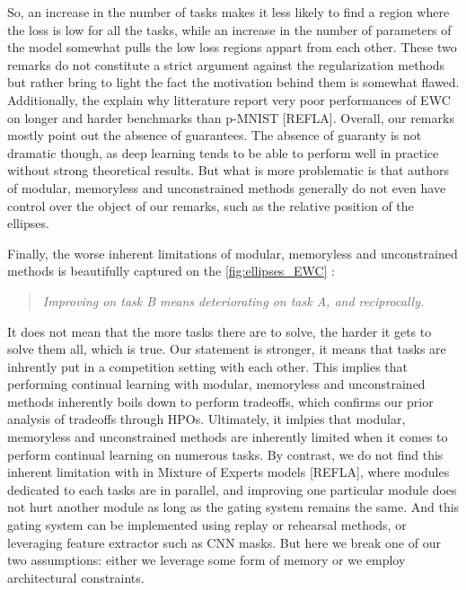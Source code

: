 \documentclass[11pt]{article}
\begin{document}
\vspace{2mm}
\noindent
So, an increase in the number of tasks makes it less likely to find a region where the loss is low for all the tasks, while an increase in the number of parameters of the model somewhat pulls the low loss regions appart from each other. These two remarks do not constitute a strict argument against the regularization methods but rather bring to light the fact the motivation behind them is somewhat flawed. Additionally, the explain why litterature report very poor performances of EWC on longer and harder benchmarks than p-MNIST [REFLA]. Overall, our remarks mostly point out the absence of guarantees. The absence of guaranty is not dramatic though, as deep learning tends to be able to perform well in practice without strong theoretical results. But what is more problematic is that authors of modular, memoryless and unconstrained methods generally do not even have control over the object of our remarks, such as the relative position of the ellipses.

\vspace{2mm}
\noindent
Finally, the worse inherent limitations of modular, memoryless and unconstrained methods is beautifully captured on the \ref{fig:ellipses_EWC} :
\begin{quote}
    \itshape
    \centering
    Improving on task B means deteriorating on task A, and reciprocally.
\end{quote}
\vspace{2mm}
\noindent
It does not mean that the more tasks there are to solve, the harder it gets to solve them all, which is true. Our statement is stronger, it means that tasks are inhrently put in a competition setting with each other. This implies that performing continual learning with modular, memoryless and unconstrained methods inherently boils down to perform tradeoffs, which confirms our prior analysis of tradeoffs through HPOs. Ultimately, it imlpies that modular, memoryless and unconstrained methods are inherently limited when it comes to perform continual learning on numerous tasks. By contrast, we do not find this inherent limitation with in Mixture of Experts models [REFLA], where modules dedicated to each tasks are in parallel, and improving one particular module does not hurt another module as long as the gating system remains the same. And this gating system can be implemented using replay or rehearsal methods, or leveraging feature extractor such as CNN masks. But here we break one of our two assumptions: either we leverage some form of memory or we employ architectural constraints.
\end{document}
